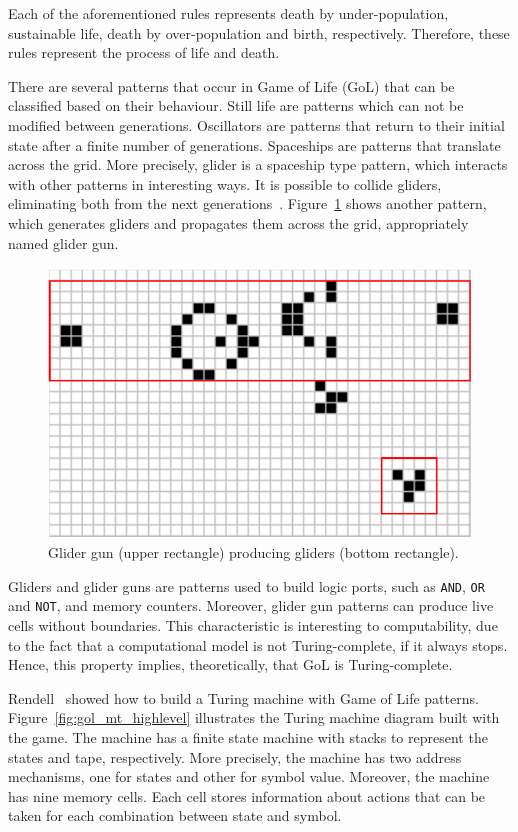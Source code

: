 \documentclass[12pt]{article}
\begin{document}
Each of the aforementioned rules represents death by under-population,
sustainable life, death by over-population and birth, respectively. Therefore,
these rules represent the process of life and death.

There are several patterns that occur in Game of Life (GoL) that can be
classified based on their behaviour. Still life are patterns which can not be
modified between generations. Oscillators are patterns that return to their
initial state after a finite number of generations. Spaceships are patterns
that translate across the grid. More precisely, glider is a spaceship type
pattern, which interacts with other patterns in interesting ways. It is
possible to collide gliders, eliminating both from the next
generations~\cite{Adamatzky:book:2012}. Figure~\ref{fig:glider_gun} shows
another pattern, which generates gliders and propagates them across the grid,
appropriately named glider gun.

\begin{figure}[h]
    \centering
    \includegraphics[scale=0.9]{images/glider-gun.pdf}
    \caption{Glider gun (upper rectangle) producing gliders (bottom
        rectangle).}\label{fig:glider_gun}
\end{figure}

Gliders and glider guns are patterns used to build logic ports, such as
\texttt{AND}, \texttt{OR} and \texttt{NOT}, and memory counters. Moreover,
glider gun patterns can produce live cells without boundaries. This
characteristic is interesting to computability, due to the fact that a
computational model is not Turing-complete, if it always stops. Hence, this
property implies, theoretically, that GoL is Turing-complete.

Rendell~\cite{Rendell:inproc:2011:jul, Rendell:phd:2014:jan} showed how to
build a Turing machine with Game of Life patterns.
Figure~\ref{fig:gol_mt_highlevel} illustrates the Turing machine diagram built
with the game. The machine has a finite state machine with stacks to represent
the states and tape, respectively. More precisely, the machine has two address
mechanisms, one for states and other for symbol value. Moreover, the machine
has nine memory cells. Each cell stores information about actions that can be
taken for each combination between state and symbol.
\end{document}
